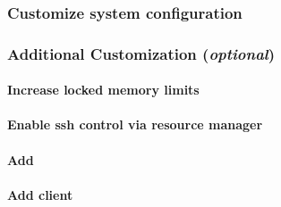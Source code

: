 \documentclass[letterpaper]{article}
\begin{document}
\subsubsection{Customize system configuration} \label{sec:master_customization}





\subsubsection{Additional Customization ({\em optional})} \label{sec:addl_customizations}


\paragraph{Increase locked memory limits}
 

\paragraph{Enable ssh control via resource manager} 


\paragraph{Add \beegfs{}} \label{sec:add_beegfs}


\paragraph{Add \Lustre{} client} \label{sec:lustre_client}



\end{document}

